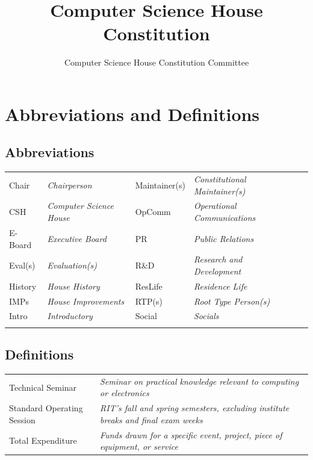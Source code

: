 \documentclass{article}
\title{Computer Science House Constitution}
\author{Computer Science House Constitution Committee}
\date{\datechanged}
\newcommand{\article}[1]{\section{#1} \label{#1}}
\begin{document}
\maketitle

\tableofcontents
\setcounter{page}{4}

\article{Abbreviations and Definitions}

\subsection{Abbreviations}
\begin{tabular}{ l  l  l l l l}
	Chair   & \textit{Chairperson}            & Maintainer(s) & \textit{Constitutional Maintainer(s)} \\
	CSH     & \textit{Computer Science House} & OpComm        & \textit{Operational Communications}   \\
	E-Board & \textit{Executive Board}        & PR            & \textit{Public Relations}             \\
	Eval(s) & \textit{Evaluation(s)}          & R\&D          & \textit{Research and Development}     \\
	History & \textit{House History}          & ResLife       & \textit{Residence Life}               \\
	IMPs    & \textit{House Improvements}     & RTP(s)        & \textit{Root Type Person(s)}          \\
	Intro   & \textit{Introductory}           & Social        & \textit{Socials}                      \\                                  \\
\end{tabular}

\subsection{Definitions}

\begin{tabular}{l l}
	Technical Seminar          & \textit{Seminar on practical knowledge relevant to computing or electronics} \\                                     
	Standard Operating Session & \textit{RIT's fall and spring semesters, excluding institute breaks and final exam weeks} \\
	Total Expenditure          & \textit{Funds drawn for a specific event, project, piece of equipment, or service}
\end{tabular}
\end{document}

